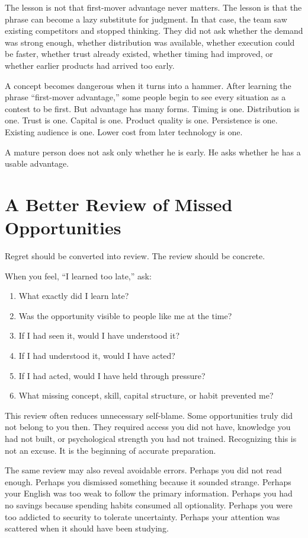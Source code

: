 The lesson is not that first-mover advantage never matters. The lesson is that the phrase can become a lazy substitute for judgment. In that case, the team saw existing competitors and stopped thinking. They did not ask whether the demand was strong enough, whether distribution was available, whether execution could be faster, whether trust already existed, whether timing had improved, or whether earlier products had arrived too early.

A concept becomes dangerous when it turns into a hammer. After learning the phrase ``first-mover advantage,'' some people begin to see every situation as a contest to be first. But advantage has many forms. Timing is one. Distribution is one. Trust is one. Capital is one. Product quality is one. Persistence is one. Existing audience is one. Lower cost from later technology is one.

A mature person does not ask only whether he is early. He asks whether he has a usable advantage.

\section*{A Better Review of Missed Opportunities}

Regret should be converted into review. The review should be concrete.

When you feel, ``I learned too late,'' ask:

\begin{enumerate}
\item What exactly did I learn late?
\item Was the opportunity visible to people like me at the time?
\item If I had seen it, would I have understood it?
\item If I had understood it, would I have acted?
\item If I had acted, would I have held through pressure?
\item What missing concept, skill, capital structure, or habit prevented me?
\end{enumerate}

This review often reduces unnecessary self-blame. Some opportunities truly did not belong to you then. They required access you did not have, knowledge you had not built, or psychological strength you had not trained. Recognizing this is not an excuse. It is the beginning of accurate preparation.

The same review may also reveal avoidable errors. Perhaps you did not read enough. Perhaps you dismissed something because it sounded strange. Perhaps your English was too weak to follow the primary information. Perhaps you had no savings because spending habits consumed all optionality. Perhaps you were too addicted to security to tolerate uncertainty. Perhaps your attention was scattered when it should have been studying.

